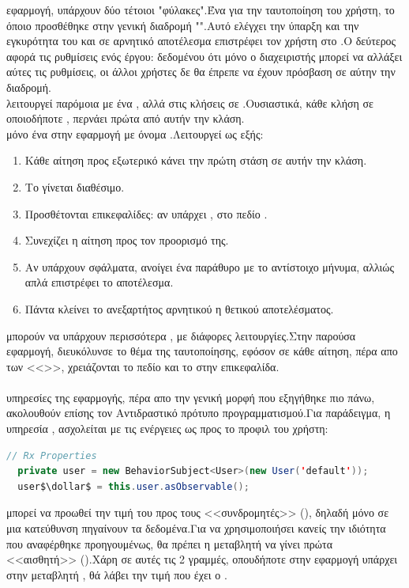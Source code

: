  εφαρμογή, υπάρχουν δύο τέτοιοι "φύλακες".Ένα για την ταυτοποίηση του χρήστη, το όποιο προσθέθηκε στην γενική διαδρομή "".Αυτό ελέγχει την ύπαρξη και την εγκυρότητα του  και σε αρνητικό αποτέλεσμα επιστρέφει τον χρήστη στο .Ο δεύτερος  αφορά τις ρυθμίσεις ενός έργου: δεδομένου ότι μόνο ο διαχειριστής μπορεί να αλλάξει αύτες τις ρυθμίσεις, οι άλλοι χρήστες δε θα έπρεπε να έχουν πρόσβαση σε αύτην την διαδρομή.\\
  λειτουργεί παρόμοια με ένα , αλλά στις κλήσεις σε .Ουσιαστικά, κάθε κλήση σε οποιοδήποτε , περνάει πρώτα από αυτήν την κλάση.\\
 μόνο ένα  στην εφαρμογή με όνομα .Λειτουργεί ως εξής:
\begin{enumerate}
	\item Κάθε αίτηση προς εξωτερικό  κάνει την πρώτη στάση σε αυτήν την κλάση.
	\item Το  γίνεται διαθέσιμο.
	\item Προσθέτονται επικεφαλίδες: αν υπάρχει , στο πεδίο .
	\item Συνεχίζει η αίτηση προς τον προορισμό της.
	\item Αν υπάρχουν σφάλματα, ανοίγει ένα  παράθυρο με το αντίστοιχο μήνυμα, αλλιώς απλά επιστρέφει το αποτέλεσμα.
	\item Πάντα κλείνει το  ανεξαρτήτος αρνητικού η θετικού αποτελέσματος.
\end{enumerate}
 μπορούν να υπάρχουν περισσότερα , με διάφορες λειτουργίες.Στην παρούσα εφαρμογή, διευκόλυνσε το θέμα της ταυτοποίησης, εφόσον σε κάθε αίτηση, πέρα απο των <<>>, χρειάζονται το πεδίο  και το  στην επικεφαλίδα.\\
\\
 υπηρεσίες της εφαρμογής, πέρα απο την γενική μορφή που εξηγήθηκε πιο πάνω, ακολουθούν επίσης τον Αντιδραστικό πρότυπο προγραμματισμού.Για παράδειγμα, η υπηρεσία , ασχολείται με τις ενέργειες ως προς το προφιλ του χρήστη:\\

	\begin{lstlisting}[language=Java]
// Rx Properties
  private user = new BehaviorSubject<User>(new User('default'));
  user$\dollar$ = this.user.asObservable();
	\end{lstlisting}
  μπορεί να προωθεί την τιμή του προς τους <<συνδρομητές>> (), δηλαδή μόνο σε μια κατεύθυνση πηγαίνουν τα δεδομένα.Για να χρησιμοποιήσει κανείς την ιδιότητα  που αναφέρθηκε προηγουμένως, θα πρέπει η μεταβλητή να γίνει πρώτα <<αισθητή>> ().Χάρη σε αυτές τις 2 γραμμές, οπουδήποτε στην εφαρμογή υπάρχει  στην μεταβλητή , θά λάβει την τιμή που έχει ο .\\

